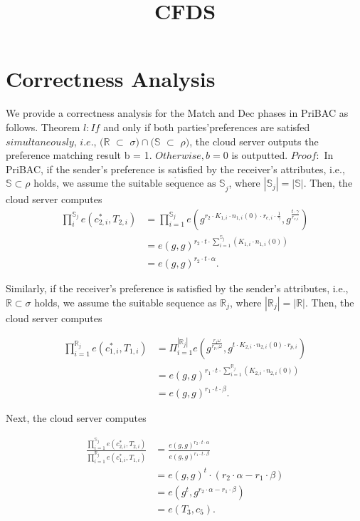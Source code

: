 \documentclass[runningheads]{llncs}
\begin{document}
\title{CFDS}

\section{Correctness Analysis}
We provide a correctness analysis for the Match and Dec phases in PriBAC as follows.
Theorem $l:If$ and only if both parties’preferences are satisfed $simultaneously$, $i. e.$, $( \mathbb{R}$ $\subset$ $\sigma ) \cap ( \mathbb{S}$ $\subset$ $\rho )$, the cloud server outputs the preference matching result b = 1. $Otherwise,b=0$ is outputted.
$Proof{: }$ In PriBAC, if the sender's preference is satisfied by the receiver's attributes, i.e., $\mathbb{S}\subset\rho$ holds, we assume the $\dot{\text{suitable sequence as }\mathbb{S}}_j$, where $|\mathbb{S}_j|=|\mathbb{S}|.$ Then, the cloud server computes
$$\begin{aligned}\prod_i^{\mathbb{S}_j}e(c_{2,i}^*,T_{2,i})&=\prod_{i=1}^{\mathbb{S}_j}e(g^{r_2\cdot K_{1,i}\cdot n_{1,i}(0)\cdot r_{e,i}\cdot\frac{1}{\gamma}},g^{\frac{t\cdot\gamma}{r_{e,i}}})\\&=e(g,g)^{r_2\cdot t\cdot\sum_{i=1}^{\mathbb{S}_j}(K_{1,i}\cdot n_{1,i}(0))}\\&=e(g,g)^{r_2\cdot t\cdot\alpha}.\end{aligned}$$

Similarly, if the receiver's preference is satisfied by the sender's attributes, i.e., $\mathbb{R}\subset\sigma$ holds, we assume the suitable sequence as $\mathbb{R}_j$, where $|\mathbb{R}_j|=|\mathbb{R}|.$ Then, the cloud server computes

$$\begin{aligned}\prod_{i=1}^{\mathbb{R}_j}e(c_{1,i}^*,T_{1,i})&=\Pi_{i=1}^{|\mathbb{R}_j|}e(g^{\frac{r_1\omega}{r_{p,i}\omega}},g^{t\cdot K_{2,i}\cdot n_{2,i}(0)\cdot r_{p,i}})\\&=e(g,g)^{r_1\cdot t\cdot\sum_{i=1}^{\mathbb{R}_j}(K_{2,i}\cdot n_{2,i}(0))}\\&=e(g,g)^{r_1\cdot t\cdot\beta}.\end{aligned}$$

Next, the cloud server computes

$$\begin{aligned}\frac{\prod_{i=1}^{\mathbb{S}_j}e(c_{2,i}^*,T_{2,i})}{\prod_{i=1}^{\mathbb{R}_j}e(c_{1,i}^*,T_{1,i})}&=\frac{e(g,g)^{r_2\cdot t\cdot\alpha}}{e(g,g)^{r_1\cdot t\cdot\beta}}\\&=e(g,g)^t\cdot(r_2\cdot\alpha-r_1\cdot\beta)\\&=e(g^t,g^{r_2\cdot\alpha-r_1\cdot\beta})\\&=e(T_3,c_5).\end{aligned}$$
\end{document}
